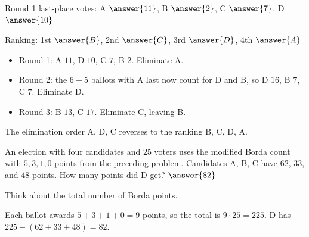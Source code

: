 \documentclass[12pt]{ximera}
\begin{document}
\begin{problem}
\begin{prompt}
Round 1 last-place votes: A $\answer{11}$, B $\answer{2}$, C $\answer{7}$,
D $\answer{10}$

\smallskip
Ranking: 1st $\answer{B}$, 2nd $\answer{C}$, 3rd $\answer{D}$, 4th $\answer{A}$

\begin{feedback}
\begin{itemize}
\item Round 1: A $11$, D $10$, C $7$, B $2$. Eliminate A.
\item Round 2: the $6+5$ ballots with A last now count for D and B, so D $16$,
      B $7$, C $7$. Eliminate D.
\item Round 3: B $13$, C $17$. Eliminate C, leaving B.
\end{itemize}
The elimination order A, D, C reverses to the ranking B, C, D, A.
\end{feedback}
\end{prompt}
\end{problem}

\begin{problem}
An election with four candidates and $25$ voters uses the modified Borda count with
$5,3,1,0$ points from the preceding problem. Candidates A, B, C have $62$, $33$, and
$48$ points. How many points did D get? $\answer{82}$

\begin{hint}
Think about the total number of Borda points.
\end{hint}

\begin{feedback}
Each ballot awards $5+3+1+0=9$ points, so the total is $9\cdot25=225$. D has
$225-(62+33+48)=82$.
\end{feedback}
\end{problem}
\end{document}
